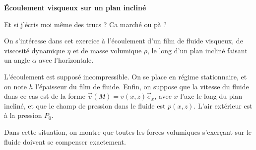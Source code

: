 




\textbf{\large{Écoulement visqueux sur un plan incliné}}


\begin{minipage}{0.7\linewidth}

Et si j'écris moi même des trucs ? Ca marché ou pà ?


On s’intéresse dans cet exercice à l’écoulement d’un film de fluide
visqueux, de viscosité dynamique $\eta$ et de masse volumique $\rho$,
le long d’un plan incliné faisant un angle $\alpha$ avec l’horizontale.

L’écoulement est supposé incompressible.
On se place en régime stationnaire, et on note $h$ l’épaisseur du film
de fluide. Enfin, on suppose que la vitesse du fluide dans ce cas
est de la forme $\vec{v}(M)=v(x,z)\vec{e}_{x}$, avec $x$ l’axe le long
du plan incliné, et que le champ de pression dans le fluide est
$p(x,z)$. L’air extérieur est à la pression $P_0$.

Dans cette situation, on montre que toutes
les forces volumiques s’exerçant sur le fluide doivent se compenser 
exactement.
\end{minipage}
\begin{minipage}{0.3\linewidth}
\begin{center}
\end{center}
\end{minipage}


